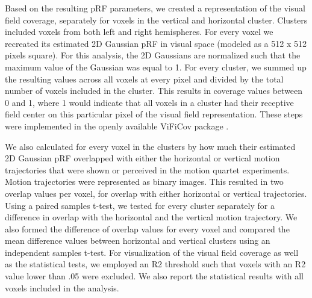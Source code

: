 Based on the resulting pRF parameters, we created a representation of the visual field coverage, separately for voxels in the vertical and horizontal cluster. Clusters included voxels from both left and right hemispheres. For every voxel we recreated its estimated 2D Gaussian pRF in visual space (modeled as a 512 x 512 pixels square). For this analysis, the 2D Gaussians are normalized such that the maximum value of the Gaussian was equal to 1. For every cluster, we summed up the resulting values across all voxels at every pixel and divided by the total number of voxels included in the cluster. This results in coverage values between 0 and 1, where 1 would indicate that all voxels in a cluster had their receptive field center on this particular pixel of the visual field representation. These steps were implemented in the openly available ViFiCov package \parencite{vificov}.

We also calculated for every voxel in the clusters by how much their estimated 2D Gaussian pRF overlapped with either the horizontal or vertical motion trajectories that were shown or perceived in the motion quartet experiments. Motion trajectories were represented as binary images. This resulted in two overlap values per voxel, for overlap with either horizontal or vertical trajectories. Using a paired samples t-test, we tested for every cluster separately for a difference in overlap with the horizontal and the vertical motion trajectory. We also formed the difference of overlap values for every voxel and compared the mean difference values between horizontal and vertical clusters using an independent samples t-test. For visualization of the visual field coverage as well as the statistical tests, we employed an R2 threshold such that voxels with an R2 value lower than .05 were excluded. We also report the statistical results with all voxels included in the analysis.

